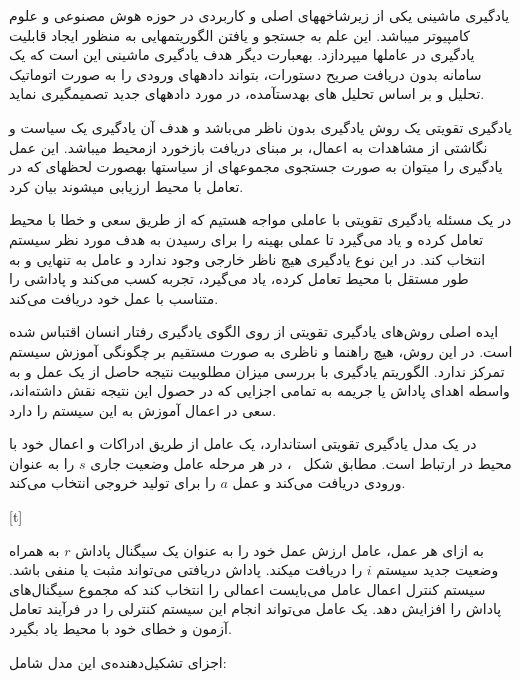 
یادگیری ماشینی یکی از زیرشاخههای اصلی و کاربردی در حوزه هوش مصنوعی و علوم کامپیوتر میباشد. این علم به جستجو و یافتن الگوریتمهایی به منظور ایجاد قابلیت یادگیری در عاملها میپردازد. بهعبارت دیگر هدف یادگیری ماشینی این است که یک سامانه بدون دریافت صریح دستورات، بتواند دادههای ورودی را به صورت اتوماتیک تحلیل و بر اساس تحلیل های بهدستآمده، در مورد دادههای جدید
تصمیمگیری نماید.


یادگیری تقویتی یک روش یادگیری بدون ناظر می‌باشد و هدف آن یادگیری یک سیاست و نگاشتی از مشاهدات به اعمال، بر مبنای دریافت بازخورد ازمحیط میباشد. این عمل یادگیری را میتوان به صورت جستجوی مجموعهای از سیاستها بهصورت لحظهای که در تعامل با محیط ارزیابی میشوند بیان کرد.

در یک مسئله یادگیری تقویتی با عاملی مواجه هستیم که از طریق سعی و خطا با محیط تعامل کرده و یاد می‌گیرد تا عملی بهینه را برای رسیدن به هدف مورد نظر سیستم انتخاب کند. در این نوع یادگیری هیچ ناظر خارجی وجود ندارد و عامل به تنهایی و به طور مستقل با محیط تعامل کرده، یاد می‌گیرد، تجربه کسب
می‌کند و پاداشی را متناسب با عمل خود دریافت می‌کند.

ایده اصلی روش‌های یادگیری تقویتی از روی الگوی یادگیری رفتار انسان اقتباس شده است. در این
روش، هیچ راهنما و ناظری به صورت مستقیم بر چگونگی آموزش سیستم تمرکز ندارد. الگوریتم یادگیری با بررسی میزان مطلوبیت نتیجه حاصل از یک عمل و به واسطه اهدای پاداش یا جریمه به تمامی اجزایی که در
حصول این نتیجه نقش داشته‌اند، سعی در اعمال آموزش به این سیستم را دارد.


در یک مدل یادگیری تقویتی استاندارد، یک عامل از طریق ادراکات و اعمال خود با محیط در ارتباط
است. مطابق شکل ~، در هر مرحله عامل وضعیت جاری $s$ را به عنوان ورودی دریافت می‌کند و عمل $a$ را برای تولید خروجی انتخاب می‌کند.

[t]

به ازای هر عمل، عامل ارزش عمل خود را به عنوان یک سیگنال پاداش
$r$ به همراه وضعیت جدید سیستم $i$ را دریافت میکند. پاداش دریافتی می‌تواند مثبت یا منفی باشد. سیستم  کنترل اعمال عامل می‌بایست اعمالی را انتخاب کند که مجموع سیگنال‌های پاداش را افزایش دهد. یک عامل
می‌تواند انجام این سیستم کنترلی را در فرآیند تعامل آزمون و خطای خود با محیط یاد بگیرد.

اجزای تشکیل‌دهنده‌ی این مدل شامل:

